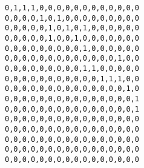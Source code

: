 \begin{figure}[H]
\texttt{0,1,1,1,0,0,0,0,0,0,0,0,0,0,0,0 \\
0,0,0,0,1,0,1,0,0,0,0,0,0,0,0,0 \\
0,0,0,0,0,1,0,1,0,1,0,0,0,0,0,0 \\
0,0,0,0,0,1,0,0,1,0,0,0,0,0,0,0 \\
0,0,0,0,0,0,0,0,0,1,0,0,0,0,0,0 \\
0,0,0,0,0,0,0,0,0,0,0,0,0,1,0,0 \\
0,0,0,0,0,0,0,0,0,1,1,0,0,0,0,0 \\
0,0,0,0,0,0,0,0,0,0,0,1,1,1,0,0 \\
0,0,0,0,0,0,0,0,0,0,0,0,0,0,1,0 \\
0,0,0,0,0,0,0,0,0,0,0,0,0,0,0,1 \\
0,0,0,0,0,0,0,0,0,0,0,0,0,0,0,1 \\
0,0,0,0,0,0,0,0,0,0,0,0,0,0,0,0 \\
0,0,0,0,0,0,0,0,0,0,0,0,0,0,0,0 \\
0,0,0,0,0,0,0,0,0,0,0,0,0,0,0,0 \\
0,0,0,0,0,0,0,0,0,0,0,0,0,0,0,0 \\
0,0,0,0,0,0,0,0,0,0,0,0,0,0,0,0 \\
}
\end{figure}
